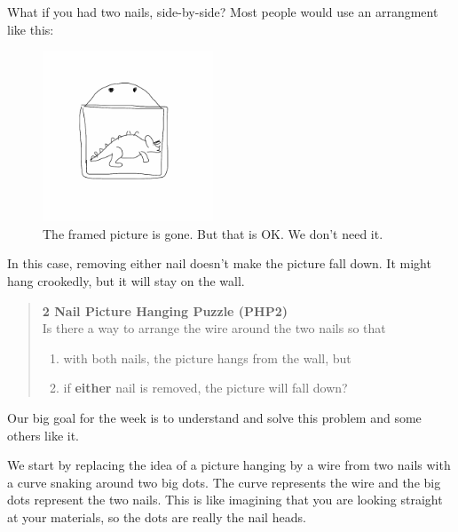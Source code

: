 \documentclass[12pt,letterpaper]{article}
\theoremstyle{definition}
\begin{document}
\clearpage
 
What if you had two nails, side-by-side? 
Most people would use an arrangment like this:
\begin{figure}[ht]
    \centering
    \includegraphics[height=2in]{rgp01pics/dinosaur}
    \caption{The framed picture is gone. But that is OK. We don't need it.}
\end{figure}

In this case, removing either nail doesn't make the picture fall down. 
It might hang crookedly, but it will stay on the wall.

\begin{quotation}
\textbf{2 Nail Picture Hanging Puzzle (PHP2)}\\
Is there a way to arrange the wire around the two nails so that
\begin{enumerate}
\item with both nails, the picture hangs from the wall, but
\item if \textbf{either} nail is removed, the picture will fall down?
\end{enumerate}
\end{quotation}

Our big goal for the week is to understand and solve this problem and some others like it.

We start by replacing the idea of a picture hanging by a wire from two nails with a curve snaking around two big dots.
The curve represents the wire and the big dots represent the two nails.
This is like imagining that you are looking straight at your materials, so the dots are really the nail heads.
\end{document}
